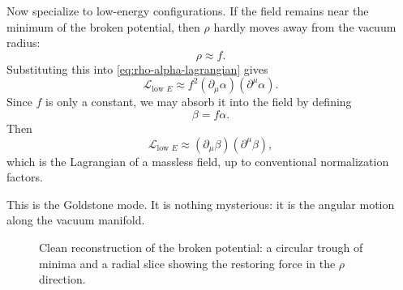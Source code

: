 Now specialize to low-energy configurations. If the field remains near the minimum of the broken potential, then \(\rho\) hardly moves away from the vacuum radius:
\[
\rho \approx f.
\]
Substituting this into \eqref{eq:rho-alpha-lagrangian} gives
\begin{equation}
\mathcal{L}_{\text{low }E}\approx f^2(\partial_\mu\alpha)(\partial^\mu\alpha).
\label{eq:goldstone-alpha}
\end{equation}
Since \(f\) is only a constant, we may absorb it into the field by defining
\begin{equation}
\beta=f\alpha.
\label{eq:beta-def}
\end{equation}
Then
\begin{equation}
\mathcal{L}_{\text{low }E}\approx (\partial_\mu\beta)(\partial^\mu\beta),
\label{eq:beta-massless}
\end{equation}
which is the Lagrangian of a massless field, up to conventional normalization factors.

This is the Goldstone mode. It is nothing mysterious: it is the angular motion along the vacuum manifold.

\begin{figure}[t]
\centering
{}
\caption{Clean reconstruction of the broken potential: a circular trough of minima and a radial slice showing the restoring force in the \(\rho\) direction.}
\label{fig:lecture07-mexican-hat}
\end{figure}

